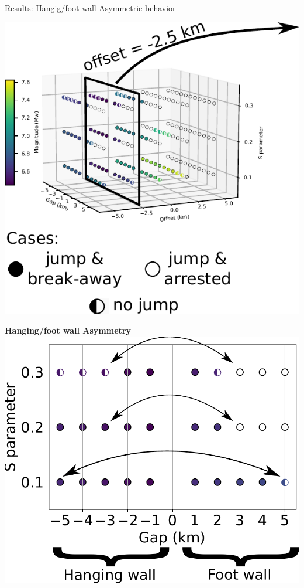 \documentclass{beamer}
\begin{document}
\begin{frame}
 {Results: Hangig/foot wall Asymmetric behavior}
 
 \begin{minipage}{0.45\linewidth}
  \includegraphics[width=1\linewidth]{images/tests_shmax340_1plane2}
 \end{minipage} \pause
 \begin{minipage}{0.5\linewidth}
  \vskip 0.2cm
  \begin{center}
  \textbf{Hanging/foot wall Asymmetry}
  \vskip 0.2cm
  \includegraphics[width=0.9\linewidth]{images/tests_asym} \pause   

\end{center}
\end{minipage}
\end{frame}
\end{document}
